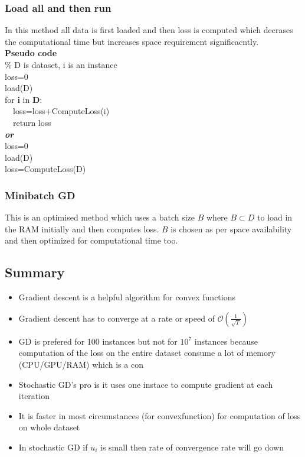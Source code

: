 \documentclass[11pt, twosides]{article}
\begin{document}
\subsubsection{Load all and then run}
In this method all data is first loaded and then loss is computed which decrases the computational time but increases space requirement significacntly.\\

\textbf{Pseudo code}\\
\% D is dataset, i is an instance\\

loss=0\\
load(D)\\
for \textbf{i} in \textbf{D}:\\
\ \ loss=loss+ComputeLoss(i)\\
\ \ return loss\\

\textbf{\textit{or }}\\
loss=0\\
\hspace{\parindent} load(D)\\
\hspace{\parindent} loss=ComputeLoss(D)


\subsubsection{Minibatch GD}
This is an optimised method which uses a batch size $B$ where $B\subset D$ to load in the RAM initially and then computes loss. $B$ is chosen as per space availability and then optimized for computational time too. 


\subsection{Summary}
\begin{itemize}
	\item Gradient descent is a helpful algorithm for convex functions
	\item Gradient descent has to converge at a rate or speed of $\mathcal{O}\left(\frac{1}{\sqrt{T}}\right)$
	\item GD is prefered for 100 instances but not for $10^7$ instances because computation of the loss on the entire dataset consume a lot of memory (CPU/GPU/RAM) which is a con
	\item Stochastic GD's pro is it uses one instace to compute gradient at each iteration
	\item It is faster in most circumstances (for convexfunction) for computation of loss on whole dataset
	\item In stochastic GD if $u_i$ is small then rate of convergence rate will go down
\end{itemize}
\end{document}
